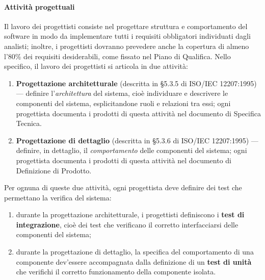 \paragraph{Attività progettuali} Il lavoro dei progettisti consiste nel progettare struttura e comportamento del software in modo da implementare tutti i requisiti obbligatori individuati dagli analisti; inoltre, i progettisti dovranno prevedere anche la copertura di almeno l'80\% dei requisiti desiderabili, come fissato nel Piano di Qualifica. Nello specifico, il lavoro dei progettisti si articola in due attività:
\begin{enumerate}
	\item \textbf{Progettazione architetturale} (descritta in §5.3.5 di ISO/IEC 12207:1995) --- definire l'\emph{architettura} del sistema, cioè individuare e descrivere le componenti del sistema, esplicitandone ruoli e relazioni tra essi; ogni progettista documenta i prodotti di questa attività nel documento di Specifica Tecnica.
	\item \textbf{Progettazione di dettaglio} (descritta in §5.3.6 di ISO/IEC 12207:1995) --- definire, in dettaglio, il \emph{comportamento} delle componenti del sistema; ogni progettista documenta i prodotti di questa attività nel documento di Definizione di Prodotto.
\end{enumerate}
Per ognuna di queste due attività, ogni progettista deve definire dei test che permettano la verifica del sistema:
\begin{enumerate}
	\item durante la progettazione architetturale, i progettisti definiscono i \textbf{test di integrazione}, cioè dei test che verificano il corretto interfacciarsi delle componenti del sistema;
	\item durante la progettazione di dettaglio, la specifica del comportamento di una componente dev'essere accompagnata dalla definizione di un \textbf{test di unità} che verifichi il corretto funzionamento della componente isolata.
\end{enumerate}


